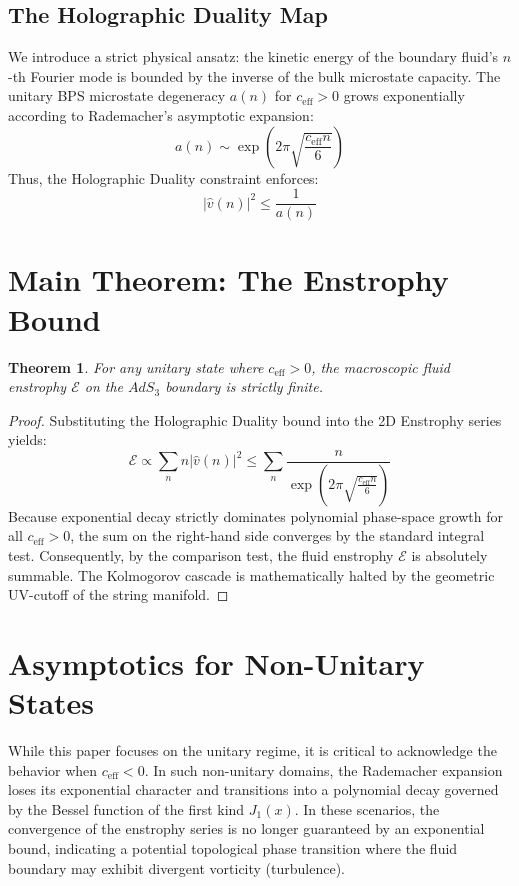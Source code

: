 \documentclass[12pt,a4paper]{article}
\newtheorem{theorem}{Theorem}[section]
\begin{document}
\subsection{The Holographic Duality Map}
We introduce a strict physical ansatz: the kinetic energy of the boundary fluid's $n$-th Fourier mode is bounded by the inverse of the bulk microstate capacity. The unitary BPS microstate degeneracy $a(n)$ for $c_{\text{eff}} > 0$ grows exponentially according to Rademacher's asymptotic expansion:
\begin{equation}
a(n) \sim \exp\left(2\pi \sqrt{\frac{c_{\text{eff}} n}{6}}\right)
\end{equation}
Thus, the Holographic Duality constraint enforces:
\begin{equation}
|\hat{v}(n)|^2 \le \frac{1}{a(n)}
\end{equation}

\section{Main Theorem: The Enstrophy Bound}

\begin{theorem}
For any unitary state where $c_{\text{eff}} > 0$, the macroscopic fluid enstrophy $\mathcal{E}$ on the $AdS_3$ boundary is strictly finite.
\end{theorem}

\begin{proof}
Substituting the Holographic Duality bound into the 2D Enstrophy series yields:
\begin{equation}
\mathcal{E} \propto \sum_{n} n |\hat{v}(n)|^2 \le \sum_{n} \frac{n}{\exp\left(2\pi \sqrt{\frac{c_{\text{eff}} n}{6}}\right)}
\end{equation}
Because exponential decay strictly dominates polynomial phase-space growth for all $c_{\text{eff}} > 0$, the sum on the right-hand side converges by the standard integral test. Consequently, by the comparison test, the fluid enstrophy $\mathcal{E}$ is absolutely summable. The Kolmogorov cascade is mathematically halted by the geometric UV-cutoff of the string manifold.
\end{proof}

\section{Asymptotics for Non-Unitary States}
While this paper focuses on the unitary regime, it is critical to acknowledge the behavior when $c_{\text{eff}} < 0$. In such non-unitary domains, the Rademacher expansion loses its exponential character and transitions into a polynomial decay governed by the Bessel function of the first kind $J_1(x)$. In these scenarios, the convergence of the enstrophy series is no longer guaranteed by an exponential bound, indicating a potential topological phase transition where the fluid boundary may exhibit divergent vorticity (turbulence).
\end{document}
